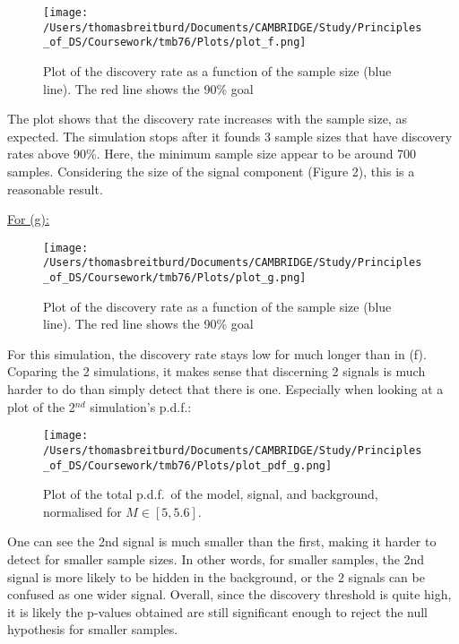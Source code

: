 \documentclass[12pt]{report} %
\begin{document}
\begin{figure}[tp]
    \centering
    \texttt{[image: /Users/thomasbreitburd/Documents/CAMBRIDGE/Study/Principles\_of\_DS/Coursework/tmb76/Plots/plot\_f.png]}
    \captionsetup{margin=1.3cm}
    \caption[width=0.2\pdfpagewidth]{Plot of the discovery rate as a function of the sample size (blue line). The red line shows the 90\% goal}
\end{figure}

The plot shows that the discovery rate increases with the sample size, as expected. The simulation stops after it founds 3 sample sizes that have discovery rates above 90\%. Here, the minimum sample size appear to be around 700 samples. Considering the size of the signal component (Figure 2), this is a reasonable result.

\vspace*{1\baselineskip}

\underline{For (g):}

\vspace*{1\baselineskip}

\begin{figure}[tp]
    \centering
    \texttt{[image: /Users/thomasbreitburd/Documents/CAMBRIDGE/Study/Principles\_of\_DS/Coursework/tmb76/Plots/plot\_g.png]}
    \captionsetup{margin=1.3cm}
    \caption[width=0.2\pdfpagewidth]{Plot of the discovery rate as a function of the sample size (blue line). The red line shows the 90\% goal}
\end{figure}

For this simulation, the discovery rate stays low for much longer than in (f). Coparing the 2 simulations, it makes sense that discerning 2 signals is much harder to do than simply detect that there is one. Especially when looking at a plot of the 2$^{nd}$ simulation's p.d.f.:
\newpage
\begin{figure}[tp]
    \centering
    \texttt{[image: /Users/thomasbreitburd/Documents/CAMBRIDGE/Study/Principles\_of\_DS/Coursework/tmb76/Plots/plot\_pdf\_g.png]}
    \captionsetup{margin=1.3cm}
    \caption[width=0.2\pdfpagewidth]{Plot of the total p.d.f.\ of the model, signal, and background, normalised for $M\in{[5,5.6]}$.}
\end{figure}

One can see the 2nd signal is much smaller than the first, making it harder to detect for smaller sample sizes. In other words, for smaller samples, the 2nd signal is more likely to be hidden in the background, or the 2 signals can be confused as one wider signal. Overall, since the discovery threshold is quite high, it is likely the p-values obtained are still significant enough to reject the null hypothesis for smaller samples. 
\end{document}
